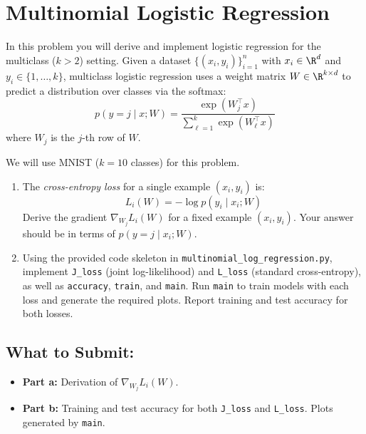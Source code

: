 \documentclass{article}
\begin{document}
\section*{Multinomial Logistic Regression}

\begin{aprob}
    In this problem you will derive and implement logistic regression for the multiclass ($k > 2$) setting.
    Given a dataset $\{(x_i, y_i)\}_{i=1}^n$ with $x_i \in \R^d$ and $y_i \in \{1, \dots, k\}$, multiclass logistic regression uses a weight matrix $W \in \R^{k \times d}$ to predict a distribution over classes via the softmax:
    $$p(y = j \mid x; W) = \frac{\exp(W_j^\top x)}{\sum_{\ell=1}^k \exp(W_\ell^\top x)}$$
    where $W_j$ is the $j$-th row of $W$.

    We will use MNIST ($k=10$ classes) for this problem.

    \begin{enumerate}
        \item {} The \emph{cross-entropy loss} for a single example $(x_i, y_i)$ is:
        $$L_i(W) = -\log p(y_i \mid x_i; W)$$
        Derive the gradient $\nabla_{W_j} L_i(W)$ for a fixed example $(x_i, y_i)$. Your answer should be in terms of $p(y = j \mid x_i; W)$.
        \item {} Using the provided code skeleton in \texttt{multinomial\_log\_regression.py}, implement \texttt{J\_loss} (joint log-likelihood) and \texttt{L\_loss} (standard cross-entropy), as well as \texttt{accuracy}, \texttt{train}, and \texttt{main}. Run \texttt{main} to train models with each loss and generate the required plots. Report training and test accuracy for both losses.
    \end{enumerate}

    \subsection*{What to Submit:}
    \begin{itemize}
        \item \textbf{Part a:} Derivation of $\nabla_{W_j} L_i(W)$.
        \item \textbf{Part b:} Training and test accuracy for both \texttt{J\_loss} and \texttt{L\_loss}. Plots generated by \texttt{main}.
    \end{itemize}
\end{aprob}
\end{document}
